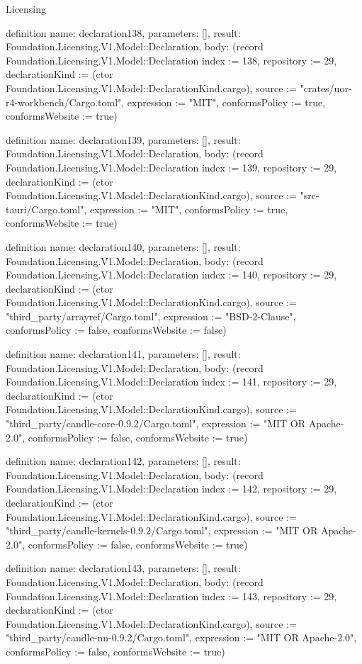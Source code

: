 \begin{lexlean}{Licensing}
\begin{semanticmodule}
definition{
  name: declaration138,
  parameters: [],
  result: Foundation.Licensing.V1.Model::Declaration,
  body: (record Foundation.Licensing.V1.Model::Declaration {index := 138, repository := 29, declarationKind := (ctor Foundation.Licensing.V1.Model::DeclarationKind.cargo), source := "crates/uor-r4-workbench/Cargo.toml", expression := "MIT", conformsPolicy := true, conformsWebsite := true})
}

definition{
  name: declaration139,
  parameters: [],
  result: Foundation.Licensing.V1.Model::Declaration,
  body: (record Foundation.Licensing.V1.Model::Declaration {index := 139, repository := 29, declarationKind := (ctor Foundation.Licensing.V1.Model::DeclarationKind.cargo), source := "src-tauri/Cargo.toml", expression := "MIT", conformsPolicy := true, conformsWebsite := true})
}

definition{
  name: declaration140,
  parameters: [],
  result: Foundation.Licensing.V1.Model::Declaration,
  body: (record Foundation.Licensing.V1.Model::Declaration {index := 140, repository := 29, declarationKind := (ctor Foundation.Licensing.V1.Model::DeclarationKind.cargo), source := "third_party/arrayref/Cargo.toml", expression := "BSD-2-Clause", conformsPolicy := false, conformsWebsite := false})
}

definition{
  name: declaration141,
  parameters: [],
  result: Foundation.Licensing.V1.Model::Declaration,
  body: (record Foundation.Licensing.V1.Model::Declaration {index := 141, repository := 29, declarationKind := (ctor Foundation.Licensing.V1.Model::DeclarationKind.cargo), source := "third_party/candle-core-0.9.2/Cargo.toml", expression := "MIT OR Apache-2.0", conformsPolicy := false, conformsWebsite := true})
}

definition{
  name: declaration142,
  parameters: [],
  result: Foundation.Licensing.V1.Model::Declaration,
  body: (record Foundation.Licensing.V1.Model::Declaration {index := 142, repository := 29, declarationKind := (ctor Foundation.Licensing.V1.Model::DeclarationKind.cargo), source := "third_party/candle-kernels-0.9.2/Cargo.toml", expression := "MIT OR Apache-2.0", conformsPolicy := false, conformsWebsite := true})
}

definition{
  name: declaration143,
  parameters: [],
  result: Foundation.Licensing.V1.Model::Declaration,
  body: (record Foundation.Licensing.V1.Model::Declaration {index := 143, repository := 29, declarationKind := (ctor Foundation.Licensing.V1.Model::DeclarationKind.cargo), source := "third_party/candle-nn-0.9.2/Cargo.toml", expression := "MIT OR Apache-2.0", conformsPolicy := false, conformsWebsite := true})
}


\end{semanticmodule}
\end{lexlean}

